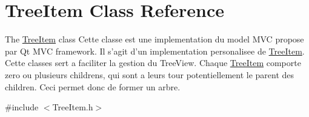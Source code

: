 \hypertarget{class_tree_item}{\section{Tree\-Item Class Reference}
\label{class_tree_item}
}


The \hyperlink{class_tree_item}{Tree\-Item} class Cette classe est une implementation du model M\-V\-C propose par Qt M\-V\-C framework. Il s'agit d'un implementation personalisee de \hyperlink{class_tree_item}{Tree\-Item}. Cette classes sert a faciliter la gestion du Tree\-View. Chaque \hyperlink{class_tree_item}{Tree\-Item} comporte zero ou plusieurs childrens, qui sont a leurs tour potentiellement le parent des children. Ceci permet donc de former un arbre.  




{\ttfamily \#include $<$Tree\-Item.\-h$>$}

